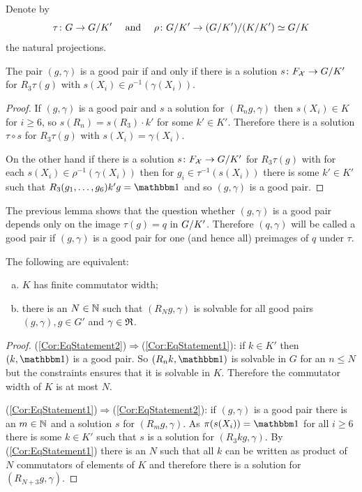 \documentclass[a4paper,11pt]{amsart}
\begin{document}
\begin{lem}
 Denote by 
 \[\tau\colon G\to{G/K'}\quad\text{ and }\quad\rho\colon {G/K'} \to {({G/K'})/({K/K'})}\simeq {G/K}\]
 the natural projections.
 
 The pair $(g,\gamma)$ is a good pair if and only if there is a solution $s\colon F_{\mathcal{X}} \to {G/K'}$
 for $R_3\tau(g)$ with $s(X_i) \in \rho^{-1}(\gamma(X_i))$. 
\end{lem}
\begin{proof}
 If $(g,\gamma)$ is a good pair and $s$ a solution for $(R_ng,\gamma)$ 
 then $s(X_i)\in K$ for $i\geq6$, so $s(R_n) = s(R_3) \cdot k'$ for some $k'\in K'$. 
 Therefore there is a solution $\tau\circ s$ for $R_3\tau(g)$ with $s(X_i) = \gamma(X_i)$.
 
 On the other hand if there is a solution $s\colon F_{\mathcal{X}} \to {G/K'}$ 
 for $R_3\tau(g)$ with for each $s(X_i) \in \rho^{-1}(\gamma(X_i))$ then
 for $g_i \in \tau^{-1}(s(X_i))$ there is some $k'\in K'$ such that
 $R_3(g_1,\dotsc,g_6)k'g=\id$ and so $(g,\gamma)$ is a good pair.
\end{proof}
The previous lemma shows that the question whether $(g,\gamma)$ is a good pair 
depends only on the image $\tau(g)=q$ in ${G/K'}$. Therefore
$(q,\gamma)$ will be called a good pair if $(g,\gamma)$ is a good pair for 
one (and hence all) preimages of $q$ under $\tau$.
\begin{cor}\label{cor:finiteCommutatorWidthKimpliesBoundedConstraintedCommutators}
The following are equivalent:
\begin{enumerate}[(a)]
 \item $K$ has finite commutator width; \label{Cor:EqStatement1}
 \item there is an $N\in\mathbb{N}$ such that $(R_Ng,\gamma)$ is solvable 
 for all good pairs $(g,\gamma),g \in G'$ and $\gamma\in\mathfrak{R}$.
 \label{Cor:EqStatement2}
\end{enumerate} 
\end{cor}
\begin{proof}
 (\ref{Cor:EqStatement2})$\Rightarrow$(\ref{Cor:EqStatement1}): if $k\in K'$ then $(k,\id)$ is a good pair.
 So $(R_nk,\id)$ is solvable in $G$ for an $n\leq N$ but the constraints ensures that it is solvable in $K$.
 Therefore the commutator width of $K$ is at most $N$.
 
 (\ref{Cor:EqStatement1})$\Rightarrow$(\ref{Cor:EqStatement2}): if $(g,\gamma)$ is a good pair 
 there is an $m\in \mathbb{N}$ and a solution $s$ for $(R_mg,\gamma)$. As $\pi(s(X_i)) =\id$ for 
 all $i\geq 6$ there is some $k\in K'$ such that $s$ is 
 a solution for $(R_3kg,\gamma)$. By (\ref{Cor:EqStatement1}) there is 
 an $N$ such that all $k$ can be written as product of $N$ commutators of elements of $K$ and
 therefore there is a solution for $(R_{N+3}g,\gamma)$.
\end{proof}
\end{document}
